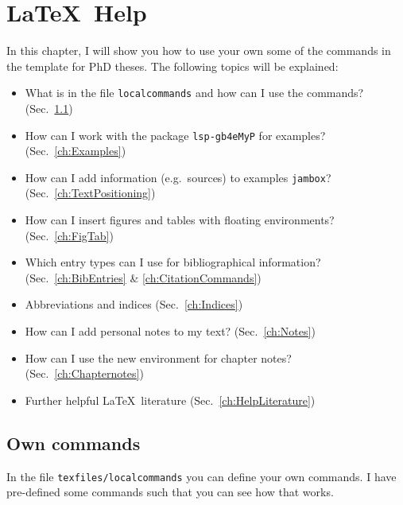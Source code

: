 \chapter{\LaTeX\ Help}
\label{ch:Help}


In this chapter, I will show you how to use your own some of the commands in the template for PhD theses. The following topics will be explained:

\begin{itemize}
	\item What is in the file \texttt{localcommands} and how can I use the commands? (Sec.~\ref{ch:Commands})
	
	\item How can I work with the package \texttt{lsp-gb4eMyP} for examples? (Sec.~\ref{ch:Examples})
	
	\item How can I add information (e.g.\ sources) to examples \texttt{jambox}? (Sec.~\ref{ch:TextPositioning})
		
	\item How can I insert figures and tables with floating environments? (Sec.~\ref{ch:FigTab})
	
	\item Which entry types can I use for bibliographical information? (Sec.~\ref{ch:BibEntries} \& \ref{ch:CitationCommands})
		
	\item Abbreviations and indices (Sec.~\ref{ch:Indices})

	\item How can I add personal notes to my text? (Sec.~\ref{ch:Notes})

	\item How can I use the new environment for chapter notes? (Sec.~\ref{ch:Chapternotes})	

	\item Further helpful \LaTeX\ literature (Sec.~\ref{ch:HelpLiterature})
\end{itemize}


\section{Own commands}
\label{ch:Commands}

In the file \texttt{texfiles/localcommands} you can define your own commands. I have pre-defined some commands such that you can see how that works.

